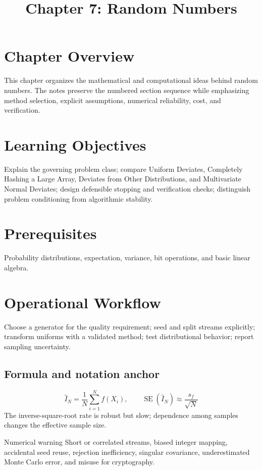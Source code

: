 \documentclass[10pt,letterpaper]{article}
\title{Chapter 7: Random Numbers}
\author{}
\date{}
\begin{document}
\maketitle

\section*{Chapter Overview}
This chapter organizes the mathematical and computational ideas behind random numbers. The notes preserve the numbered section sequence while emphasizing method selection, explicit assumptions, numerical reliability, cost, and verification.

\section*{Learning Objectives}
Explain the governing problem class; compare Uniform Deviates, Completely Hashing a Large Array, Deviates from Other Distributions, and Multivariate Normal Deviates; design defensible stopping and verification checks; distinguish problem conditioning from algorithmic stability.

\section*{Prerequisites}
Probability distributions, expectation, variance, bit operations, and basic linear algebra.

\section*{Operational Workflow}
Choose a generator for the quality requirement; seed and split streams explicitly; transform uniforms with a validated method; test distributional behavior; report sampling uncertainty.

\subsection*{Formula and notation anchor}
\[
\widehat{I}_N=\frac1N\sum_{i=1}^{N} f(X_i),\qquad \operatorname{SE}(\widehat{I}_N)\approx\frac{s_f}{\sqrt{N}}
\]
The inverse-square-root rate is robust but slow; dependence among samples changes the effective sample size.

\begin{warnbox}{Numerical warning}
Short or correlated streams, biased integer mapping, accidental seed reuse, rejection inefficiency, singular covariance, underestimated Monte Carlo error, and misuse for cryptography.
\end{warnbox}
\end{document}
